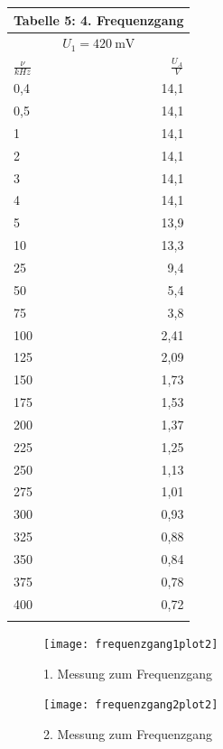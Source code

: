 \documentclass{scrartcl}
\begin{document}
\begin{minipage}{0.6\textwidth}
\begin{tabular}{@{}lr@{}}
     \multicolumn{2}{c}{Tabelle 5: 4. Frequenzgang} \\
      \toprule
    \multicolumn{2}{c}{$U_1 = \SI{420}{\milli \volt}$} \\
    \cmidrule(r){1-2}
    $\frac{\nu}{kHz}$ & $\frac{U_A}{V}$ \\
    \midrule
0,4 & 14,1 \\
    0,5  & 14,1 \\
    1 & 14,1 \\
    2 & 14,1 \\
    3 &  14,1 \\
    4 & 14,1 \\
    5 & 13,9 \\
    10 & 13,3 \\
     25 & 9,4 \\
     50 & 5,4 \\
     75 & 3,8 \\
     100 & 2,41 \\
     125 & 2,09 \\
     150 & 1,73 \\
     175 & 1,53 \\
     200 & 1,37 \\
     225 & 1,25 \\
     250 & 1,13 \\
     275 & 1,01 \\
     300 & 0,93 \\
     325 & 0,88 \\
     350 & 0,84 \\
     375 & 0,78 \\
     400 & 0,72 \\
     \bottomrule
      \\

\end{tabular}

\end{minipage}


\newpage

\begin{figure}[!h]
\centering
\texttt{[image: frequenzgang1plot2]}
\caption{1. Messung zum Frequenzgang}
\label{integrator}
\end{figure}

\begin{figure}[!h]
\centering
\texttt{[image: frequenzgang2plot2]}
\caption{2. Messung zum Frequenzgang}
\label{differentiator}
\end{figure}
\end{document}
